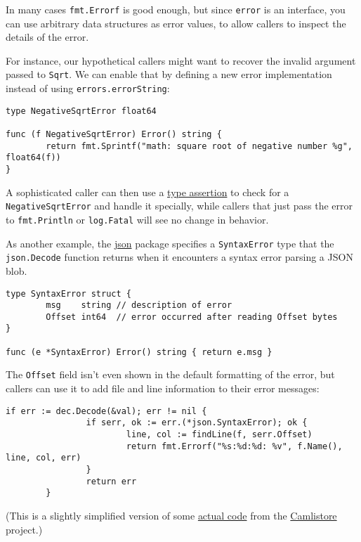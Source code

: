 In many cases \texttt{fmt.Errorf} is good enough, but since
\texttt{error} is an interface, you can use arbitrary data structures as
error values, to allow callers to inspect the details of the error.

For instance, our hypothetical callers might want to recover the invalid
argument passed to \texttt{Sqrt}. We can enable that by defining a new
error implementation instead of using \texttt{errors.errorString}:

\begin{Verbatim}[frame=single]
type NegativeSqrtError float64

func (f NegativeSqrtError) Error() string {
        return fmt.Sprintf("math: square root of negative number %g", float64(f))
}
\end{Verbatim}

A sophisticated caller can then use a
\href{http://golang.org/doc/go\_spec.html\#Type\_assertions}{type
assertion} to check for a \texttt{NegativeSqrtError} and handle it
specially, while callers that just pass the error to \texttt{fmt.Println}
or \texttt{log.Fatal} will see no change in behavior.

As another example, the \href{http://golang.org/pkg/encoding/json/}{json}
package specifies a \texttt{SyntaxError} type that the \texttt{json.Decode}
function returns when it encounters a syntax error parsing a JSON
blob.

\begin{Verbatim}[frame=single]
type SyntaxError struct {
        msg    string // description of error
        Offset int64  // error occurred after reading Offset bytes
}

func (e *SyntaxError) Error() string { return e.msg }
\end{Verbatim}

The \texttt{Offset} field isn't even shown in the default formatting of
the error, but callers can use it to add file and line information to
their error messages:

\begin{Verbatim}[frame=single]
        if err := dec.Decode(&val); err != nil {
                if serr, ok := err.(*json.SyntaxError); ok {
                        line, col := findLine(f, serr.Offset)
                        return fmt.Errorf("%s:%d:%d: %v", f.Name(), line, col, err)
                }
                return err
        }
\end{Verbatim}

(This is a slightly simplified version of some
\href{http://camlistore.org/code/?p=camlistore.git;a=blob;f=lib/go/camli/jsonconfig/eval.go\#l68}{actual
code} from the \href{http://camlistore.org}{Camlistore} project.)

